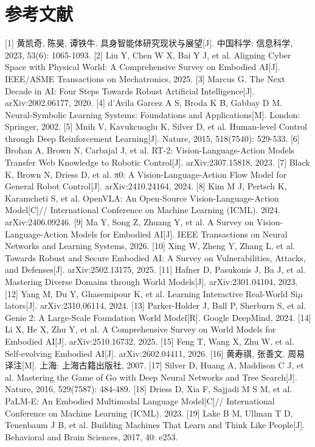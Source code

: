 \documentclass[12pt,a4paper]{article}
\begin{document}
\section*{参考文献}
[1] 黄凯奇, 陈昊, 谭铁牛. 具身智能体研究现状与展望[J]. 中国科学: 信息科学, 2023, 53(6): 1065-1093.
[2] Liu Y, Chen W X, Bai Y J, et al. Aligning Cyber Space with Physical World: A Comprehensive Survey on Embodied AI[J]. IEEE/ASME Transactions on Mechatronics, 2025.
[3] Marcus G. The Next Decade in AI: Four Steps Towards Robust Artificial Intelligence[J]. arXiv:2002.06177, 2020.
[4] d'Avila Garcez A S, Broda K B, Gabbay D M. Neural-Symbolic Learning Systems: Foundations and Applications[M]. London: Springer, 2002.
[5] Mnih V, Kavukcuoglu K, Silver D, et al. Human-level Control through Deep Reinforcement Learning[J]. Nature, 2015, 518(7540): 529-533.
[6] Brohan A, Brown N, Carbajal J, et al. RT-2: Vision-Language-Action Models Transfer Web Knowledge to Robotic Control[J]. arXiv:2307.15818, 2023.
[7] Black K, Brown N, Driess D, et al. π0: A Vision-Language-Action Flow Model for General Robot Control[J]. arXiv:2410.24164, 2024.
[8] Kim M J, Pertsch K, Karamcheti S, et al. OpenVLA: An Open-Source Vision-Language-Action Model[C]// International Conference on Machine Learning (ICML). 2024. arXiv:2406.09246.
[9] Ma Y, Song Z, Zhuang Y, et al. A Survey on Vision-Language-Action Models for Embodied AI[J]. IEEE Transactions on Neural Networks and Learning Systems, 2026.
[10] Xing W, Zheng Y, Zhang L, et al. Towards Robust and Secure Embodied AI: A Survey on Vulnerabilities, Attacks, and Defenses[J]. arXiv:2502.13175, 2025.
[11] Hafner D, Pasukonis J, Ba J, et al. Mastering Diverse Domains through World Models[J]. arXiv:2301.04104, 2023.
[12] Yang M, Du Y, Ghasemipour K, et al. Learning Interactive Real-World Si$\mu$lators[J]. arXiv:2310.06114, 2024.
[13] Parker-Holder J, Ball P, Sherburn S, et al. Genie 2: A Large-Scale Foundation World Model[R]. Google DeepMind, 2024.
[14] Li X, He X, Zhu Y, et al. A Comprehensive Survey on World Models for Embodied AI[J]. arXiv:2510.16732, 2025.
[15] Feng T, Wang X, Zhu W, et al. Self-evolving Embodied AI[J]. arXiv:2602.04411, 2026.
[16] 黄寿祺, 张善文. 周易译注[M]. 上海: 上海古籍出版社, 2007.
[17] Silver D, Huang A, Maddison C J, et al. Mastering the Game of Go with Deep Neural Networks and Tree Search[J]. Nature, 2016, 529(7587): 484-489.
[18] Driess D, Xia F, Sajjadi M S M, et al. PaLM-E: An Embodied Multimodal Language Model[C]// International Conference on Machine Learning (ICML). 2023.
[19] Lake B M, Ullman T D, Tenenbaum J B, et al. Building Machines That Learn and Think Like People[J]. Behavioral and Brain Sciences, 2017, 40: e253.
\end{document}
